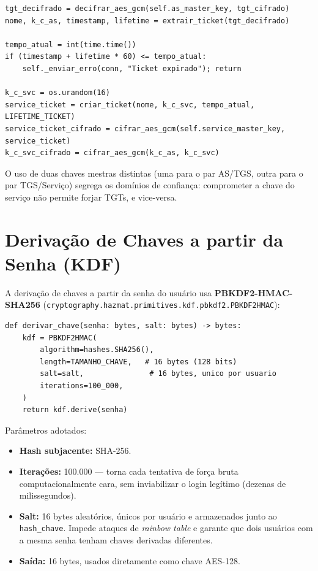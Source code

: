 \documentclass[11pt,a4paper]{article}
\begin{document}
\begin{lstlisting}
tgt_decifrado = decifrar_aes_gcm(self.as_master_key, tgt_cifrado)
nome, k_c_as, timestamp, lifetime = extrair_ticket(tgt_decifrado)

tempo_atual = int(time.time())
if (timestamp + lifetime * 60) <= tempo_atual:
    self._enviar_erro(conn, "Ticket expirado"); return

k_c_svc = os.urandom(16)
service_ticket = criar_ticket(nome, k_c_svc, tempo_atual, LIFETIME_TICKET)
service_ticket_cifrado = cifrar_aes_gcm(self.service_master_key, service_ticket)
k_c_svc_cifrado = cifrar_aes_gcm(k_c_as, k_c_svc)
\end{lstlisting}

O uso de duas chaves mestras distintas (uma para o par AS/TGS, outra para o par
TGS/Serviço) segrega os domínios de confiança: comprometer a chave do serviço não permite
forjar TGTs, e vice-versa.

\section{Derivação de Chaves a partir da Senha (KDF)}
\label{sec:kdf}

A derivação de chaves a partir da senha do usuário usa \textbf{PBKDF2-HMAC-SHA256}
(\texttt{cryptography.hazmat.primitives.kdf.pbkdf2.PBKDF2HMAC}):

\begin{lstlisting}
def derivar_chave(senha: bytes, salt: bytes) -> bytes:
    kdf = PBKDF2HMAC(
        algorithm=hashes.SHA256(),
        length=TAMANHO_CHAVE,   # 16 bytes (128 bits)
        salt=salt,               # 16 bytes, unico por usuario
        iterations=100_000,
    )
    return kdf.derive(senha)
\end{lstlisting}

Parâmetros adotados:
\begin{itemize}
    \item \textbf{Hash subjacente:} SHA-256.
    \item \textbf{Iterações:} 100.000 --- torna cada tentativa de força bruta
    computacionalmente cara, sem inviabilizar o login legítimo (dezenas de milissegundos).
    \item \textbf{Salt:} 16 bytes aleatórios, únicos por usuário e armazenados junto ao
    \texttt{hash\_chave}. Impede ataques de \emph{rainbow table} e garante que dois
    usuários com a mesma senha tenham chaves derivadas diferentes.
    \item \textbf{Saída:} 16 bytes, usados diretamente como chave AES-128.
\end{itemize}
\end{document}
